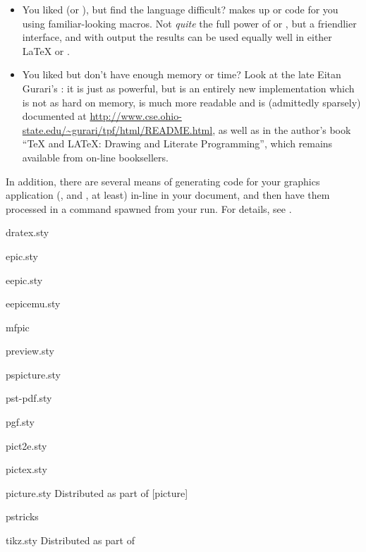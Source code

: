 \begin{itemize}
  Note that you can %
   (i.e.,
  keep it in-line with your \LaTeX{} code).
\item You liked \MF{} (or \MP{}), but find the language difficult?
   makes up \MF{} or \MP{} code for you using
  familiar-looking \AllTeX{} macros.  Not \emph{quite} the full power
  of \MF{} or \MP{}, but a friendlier interface, and with \MP{} output
  the results can be used equally well in either \LaTeX{} or \PDFLaTeX{}.
\item You liked \pictex{} but don't have enough memory or time?  Look
  at the late Eitan Gurari's : it is just as powerful,
  but is an entirely new implementation which is not as hard on
  memory, is much more readable and is (admittedly sparsely) documented at
  \url{http://www.cse.ohio-state.edu/~gurari/tpf/html/README.html},
  as well as in the author's book ``TeX and LATeX: Drawing and
  Literate Programming'', which remains available from on-line
  booksellers.
\end{itemize}

In addition, there are several means of generating code for your
graphics application (,  and
\MP{}, at least) in-line in your document, and then have them
processed in a command spawned from your \AllTeX{} run.  For details,
see .
\begin{ctanrefs}
\item[dratex.sty]
\item[epic.sty]
\item[eepic.sty]
\item[eepicemu.sty]
\item[mfpic]
\item[preview.sty]
\item[pspicture.sty]
\item[pst-pdf.sty]
\item[pgf.sty]
\item[pict2e.sty]
\item[pictex.sty]
\item[picture.sty]Distributed as part of [picture]
\item[pstricks]
\item[tikz.sty]Distributed as part of 
\end{ctanrefs}

